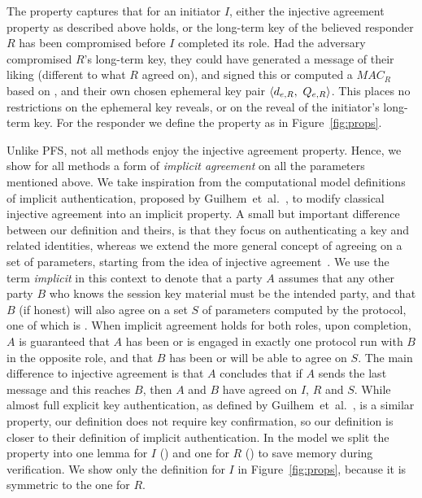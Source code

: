 %
The property captures that for an initiator $I$, either the injective agreement
property as described above holds, or the long-term key of the believed
responder $R$ has been compromised before $I$ completed its role.
%
Had the adversary compromised $R$'s long-term key, they could have generated a
message of their liking (different to what $R$ agreed on), and signed this or
computed a $\mathit{MAC}_R$ based on ,  and their own chosen
ephemeral key pair $\langle d_{e,R},\ Q_{e,R}\rangle$.
%
This places no restrictions on the ephemeral
key reveals, or on the reveal of the initiator's long-term key.
%
For the responder we define the property \mPredInjR{} as in
Figure~\ref{fig:props}.
%

Unlike PFS, not all \mEdhoc{} methods enjoy the injective agreement property.
%
Hence, we show for all methods a form of \emph{implicit agreement} on all the
parameters mentioned above.
%
We take inspiration from the computational model definitions of implicit
authentication, proposed by Guilhem~et~al.~\cite{DBLP:conf/csfw/GuilhemFW20}, to
modify classical injective agreement into an implicit property.
%
A small but important difference between our definition and theirs, is that
they focus on
authenticating a key and related identities, whereas we extend the more general
concept of agreeing on a set of parameters, starting from the idea of injective
agreement~\cite{DBLP:conf/csfw/Lowe97a}.
%
We use the term \emph{implicit} in this context to denote that a party $A$
assumes that any other party $B$ who knows the session key material \mSessKey{} must
be the intended party, and that $B$ (if honest) will also agree on a set
$S$ of parameters computed by the protocol, one of which is \mSessKey{}.
%
When implicit agreement holds for both roles, upon completion, $A$ is guaranteed
that $A$ has been or is engaged in exactly one protocol run with $B$ in the
opposite role, and that $B$ has been or will be able to agree on $S$.
%
The main difference to injective agreement is that $A$ concludes that if
$A$ sends the last message and this reaches $B$, then $A$ and $B$ have agreed
on $I$, $R$ and $S$.
%
While almost full explicit key authentication, as defined by
Guilhem~et~al.~\cite{DBLP:conf/csfw/GuilhemFW20}, is a similar property, our
definition does not require key confirmation, so our definition is closer to
their definition of implicit authentication.
%
In the \mTamarin{} model we split the property into one lemma for
$I$ (\mPredImpI{}) and one for $R$ (\mPredImpR{}) to save memory during
verification.
%
We show only the definition for $I$ in Figure~\ref{fig:props}, because it is
symmetric to the one for $R$.
%

